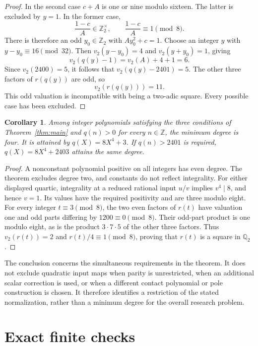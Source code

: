 \documentclass[11pt,a4paper]{article}
\newtheorem{corollary}[theorem]{Corollary}
\newcommand{\Q}{\mathbb Q}\newcommand{\Z}{\mathbb Z}
\begin{document}
\begin{proof}
In the second case $c+A$ is one or nine modulo sixteen.
The latter is excluded by $y=1$. In the former case,
\[
                \frac{1-c}{A}\in\Z_2^\times,
                \qquad\frac{1-c}{A}\equiv1\pmod8.
\]
There is therefore an odd $y_0\in\Z_2$ with $Ay_0^2+c=1$.
Choose an integer $y$ with $y-y_0\equiv16\pmod{32}$.
Then $v_2(y-y_0)=4$ and $v_2(y+y_0)=1$, giving
\[
              v_2(q(y)-1)=v_2(A)+4+1=6.
\]
Since $v_2(2400)=5$, it follows that
$v_2(q(y)-2401)=5$. The other three factors of $r(q(y))$
are odd, so
\[
                         v_2(r(q(y)))=11.
\]
This odd valuation is incompatible with being a two-adic square.
Every possible case has been excluded.
\end{proof}

\begin{corollary}\label{cor:sharpness}
Among integer polynomials satisfying the three conditions of
Theorem~\ref{thm:main} and $q(n)>0$ for every $n\in\Z$, the
minimum degree is four. It is attained by $q(X)=8X^4+3$.
If $q(n)>2401$ is required, $q(X)=8X^4+2403$ attains the same degree.
\end{corollary}
\begin{proof}
A nonconstant polynomial positive on all integers has even degree.
The theorem excludes degree two, and constants do not reflect
integrality. For either displayed quartic, integrality at a reduced
rational input $u/v$ implies $v^4\mid8$, and hence $v=1$.
Its values have the required positivity and are three modulo eight.
For every integer $t\equiv3\pmod8$, the two even factors of $r(t)$
have valuation one and odd parts differing by
$1200\equiv0\pmod8$. Their odd-part product is one modulo eight,
as is the product $3\cdot7\cdot5$ of the other three factors.
Thus $v_2(r(t))=2$ and $r(t)/4\equiv1\pmod8$, proving that
$r(t)$ is a square in $\Q_2$.
\end{proof}

The conclusion concerns the simultaneous requirements in the theorem.
It does not exclude quadratic input maps when parity is unrestricted,
when an additional scalar correction is used, or when a different
contact polynomial or pole construction is chosen. It therefore
identifies a restriction of the stated normalization, rather than a
minimum degree for the overall research problem.

\section{Exact finite checks}
\end{document}
